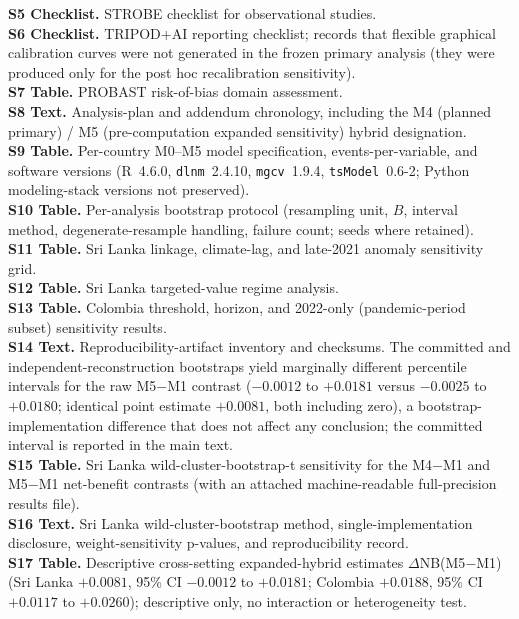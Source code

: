 \documentclass[11pt,a4paper]{article}
\begin{document}
\textbf{S5 Checklist.} STROBE checklist for observational studies.\\
\textbf{S6 Checklist.} TRIPOD+AI reporting checklist; records that flexible graphical calibration curves were not generated in the frozen primary analysis (they were produced only for the post hoc recalibration sensitivity).\\
\textbf{S7 Table.} PROBAST risk-of-bias domain assessment.\\
\textbf{S8 Text.} Analysis-plan and addendum chronology, including the M4 (planned primary) / M5 (pre-computation expanded sensitivity) hybrid designation.\\
\textbf{S9 Table.} Per-country M0--M5 model specification, events-per-variable, and software versions (R~4.6.0, \texttt{dlnm}~2.4.10, \texttt{mgcv}~1.9.4, \texttt{tsModel}~0.6-2; Python modeling-stack versions not preserved).\\
\textbf{S10 Table.} Per-analysis bootstrap protocol (resampling unit, $B$, interval method, degenerate-resample handling, failure count; seeds where retained).\\
\textbf{S11 Table.} Sri Lanka linkage, climate-lag, and late-2021 anomaly sensitivity grid.\\
\textbf{S12 Table.} Sri Lanka targeted-value regime analysis.\\
\textbf{S13 Table.} Colombia threshold, horizon, and 2022-only (pandemic-period subset) sensitivity results.\\
\textbf{S14 Text.} Reproducibility-artifact inventory and checksums. The committed and independent-reconstruction bootstraps yield marginally different percentile intervals for the raw M5$-$M1 contrast ($-0.0012$ to $+0.0181$ versus $-0.0025$ to $+0.0180$; identical point estimate $+0.0081$, both including zero), a bootstrap-implementation difference that does not affect any conclusion; the committed interval is reported in the main text.\\
\textbf{S15 Table.} Sri Lanka wild-cluster-bootstrap-t sensitivity for the M4$-$M1 and M5$-$M1 net-benefit contrasts (with an attached machine-readable full-precision results file).\\
\textbf{S16 Text.} Sri Lanka wild-cluster-bootstrap method, single-implementation disclosure, weight-sensitivity p-values, and reproducibility record.\\
\textbf{S17 Table.} Descriptive cross-setting expanded-hybrid estimates $\Delta$NB(M5$-$M1) (Sri Lanka $+0.0081$, 95\% CI $-0.0012$ to $+0.0181$; Colombia $+0.0188$, 95\% CI $+0.0117$ to $+0.0260$); descriptive only, no interaction or heterogeneity test.\\
\end{document}
